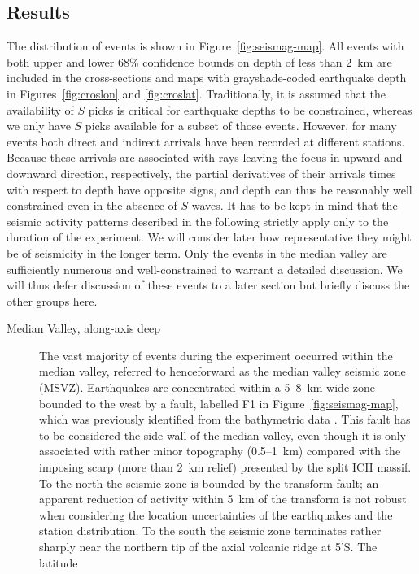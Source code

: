 \documentclass[jgr]{agu2001}
\begin{document}
\begin{article}
\subsection{Results}

The distribution of events is shown in
Figure~\ref{fig:seismag-map}. All events with both upper
and lower 68\% confidence bounds on depth of less than 2~km are
included in the cross-sections and maps with grayshade-coded earthquake
depth in Figures~\ref{fig:croslon} and \ref{fig:croslat}.
Traditionally, it is assumed that the availability of $S$ picks is
critical for earthquake depths to be constrained, whereas we only have
$S$ picks available for a subset of those events.  However, for many
events both direct and indirect arrivals have been recorded at
different stations.  Because these arrivals are associated with rays leaving
the focus in upward and downward direction, respectively, the
partial derivatives of their arrivals times with respect to depth have
opposite signs, and depth can thus be reasonably well constrained even
in the absence of $S$ waves.
It has to be kept in mind that the seismic activity patterns described
in the following strictly apply only to the duration of the
experiment. We will consider later how representative they might be of
seismicity in the longer term.  Only the events in the median valley
are sufficiently numerous and well-constrained to warrant a detailed
discussion.  We will thus defer discussion of these events to a later
section but briefly discuss the other groups here.
\begin{description}
\item[Median Valley, along-axis deep]  The vast majority of events during the
experiment occurred within the median valley, referred to henceforward
as the median valley seismic zone (MSVZ).  Earthquakes are
concentrated within a 5--8~km wide zone bounded to the west by a
fault, labelled F1 in Figure~\ref{fig:seismag-map}, which was
previously identified from the bathymetric data \citep{reston02}.
This fault has to be considered the side wall of the median
valley, even though it is only associated with rather minor topography
(0.5--1~km) compared with the imposing scarp (more than 2~km relief)
presented by the split ICH massif.  To the north the seismic zone is
bounded by the transform fault; an apparent reduction of activity
within 5~km of the transform is not robust when considering the
location uncertainties of the earthquakes and the station
distribution. To the south the seismic zone terminates rather sharply near the
northern tip of the axial volcanic ridge at 5'S.  The latitude

\end{description}
\end{article}
\end{document}
